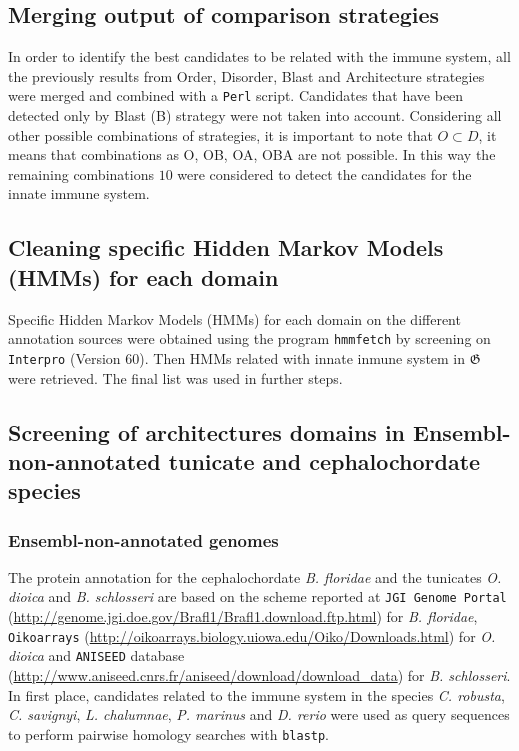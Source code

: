 \documentclass[11pt]{article}
\begin{document}
\subsection*{Merging output of comparison strategies}
In order to identify the best candidates to be related with the immune 
system, all the previously results from Order, Disorder, Blast and Architecture 
strategies were merged and combined with a \texttt{Perl} script. Candidates 
that have been detected only by Blast (B) strategy were not taken into 
account. Considering all other possible combinations of strategies, it is 
important to note that $O \subset D$, it means that combinations as O, OB, OA, 
OBA are not possible. In this way the remaining combinations $10$ were 
considered to detect the candidates for the innate immune system.

\subsection*{Cleaning specific Hidden Markov Models (HMMs) for each 
domain}
Specific Hidden Markov Models (HMMs) for each domain on the different 
annotation sources were obtained using the program \texttt{hmmfetch} by 
screening on \texttt{Interpro} (Version 60). Then HMMs related with innate 
inmune system in $\boldsymbol{\mathfrak{G}}$ were retrieved. The final list was 
used in further steps.

\subsection*{Screening of architectures domains in Ensembl-non-annotated 
tunicate and cephalochordate species}

\subsubsection*{Ensembl-non-annotated genomes}

The protein annotation for the cephalochordate \textsl{B. floridae} and 
the tunicates \textsl{O. dioica} and \textsl{B. schlosseri} are based on the 
scheme reported at \texttt{JGI Genome Portal} 
(\url{http://genome.jgi.doe.gov/Brafl1/Brafl1.download.ftp.html}) for \textsl{B. 
floridae}, \texttt{Oikoarrays} 
(\url{http://oikoarrays.biology.uiowa.edu/Oiko/Downloads.html}) for \textsl{O. 
dioica} and \texttt{ANISEED} database 
(\url{http://www.aniseed.cnrs.fr/aniseed/download/download_data}) for \textsl{B. 
schlosseri}. In first place, candidates related to the immune system in the 
species \textit{C. robusta}, \textsl{C. savignyi}, \textsl{L. chalumnae}, 
\textsl{P. marinus} and \textit{D. rerio} were used as query sequences to 
perform pairwise homology searches with \texttt{blastp}.
\end{document}
